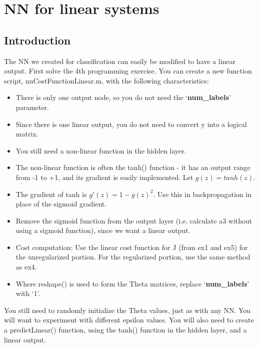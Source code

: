 \section{NN for linear systems}
\subsection{Introduction}
The NN we created for classification can easily be modified to have a linear output. First solve the 4th programming exercise. You can create a new function script, nnCostFunctionLinear.m, with the following characteristics:
\begin{itemize}
\item There is only one output node, so you do not need the `\textbf{num\_labels}' parameter.
\item Since there is one linear output, you do not need to convert y into a logical matrix.
\item You still need a non-linear function in the hidden layer.
\item The non-linear function is often the tanh() function - it has an output range from -1 to +1, and its gradient is easily implemented. Let $g(z)=tanh(z)$.
\item The gradient of tanh is $g'(z) = 1 - g(z)^2$. Use this in backpropagation in place of the sigmoid gradient.
\item Remove the sigmoid function from the output layer (i.e. calculate a3 without using a sigmoid function), since we want a linear output.
\item Cost computation: Use the linear cost function for J (from ex1 and ex5) for the unregularized portion. For the regularized portion, use the same method as ex4.
\item Where reshape() is used to form the Theta matrices, replace `\textbf{num\_labels}' with `1'.
\end{itemize}

You still need to randomly initialize the Theta values, just as with any NN. You will want to experiment with different epsilon values. You will also need to create a predictLinear() function, using the tanh() function in the hidden layer, and a linear output.
